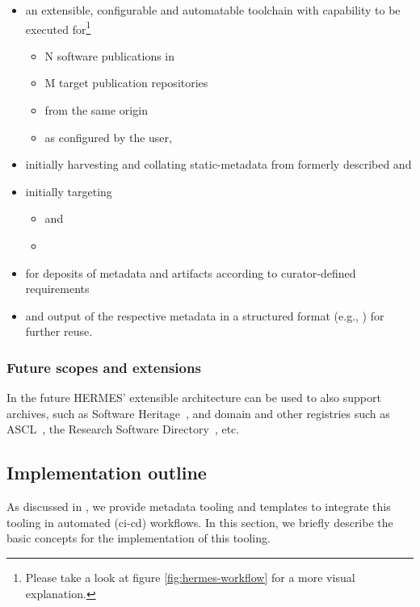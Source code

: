 \documentclass[11pt,a4paper]{scrartcl}
\begin{document}
\begin{itemize}  
    \item an extensible, configurable and automatable toolchain with capability to 
          be executed for\footnote{Please take a look at figure \ref{fig:hermes-workflow} for a more visual explanation.}
        \begin{itemize}  
            \item N software publications in 
            \item M target publication repositories 
            \item from the same origin
            \item as configured by the user,
        \end{itemize}
    \item initially harvesting and collating \gls{static-metadata} from formerly described  and
    \item initially targeting
        \begin{itemize}  
            \item {} and
            \item {}
        \end{itemize}
    \item for deposits of metadata and artifacts according to curator-defined requirements
    \item and output of the respective metadata in a structured format (e.g., ) for further reuse.
\end{itemize}

\subsubsection{Future scopes and extensions}\label{subsubsec:concept-scope-future}
In the future HERMES’ extensible architecture can be used to also support archives, such as Software Heritage~\cite{SWHArchive}, 
and domain and other registries such as ASCL~\cite{ASCL-Software-Citation}, the Research Software Directory~\cite{RSD-2018}, etc.



\subsection{Implementation outline}\label{subsec:concept-implementation}
As discussed in , we provide metadata tooling and templates to integrate this tooling in
automated (\gls{ci-cd}) workflows. In this section, we briefly describe the basic concepts for the implementation of this tooling.
\end{document}
